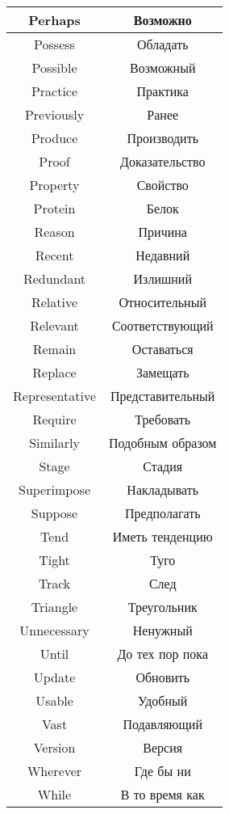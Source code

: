 \begin{table}[h!]
  \centering
  \begin{tabular}{|*{2}{C{.4}|}} \hline
    Perhaps & Возможно \\ \hline
    Possess & Обладать \\ \hline
    Possible & Возможный \\ \hline
    Practice & Практика \\ \hline
    Previously & Ранее \\ \hline
    Produce & Производить \\ \hline
    Proof & Доказательство \\ \hline
    Property & Свойство \\ \hline
    Protein & Белок \\ \hline
    Reason & Причина \\ \hline
    Recent & Недавний \\ \hline
    Redundant & Излишний \\ \hline
    Relative & Относительный \\ \hline
    Relevant & Соответствующий \\ \hline
    Remain & Оставаться \\ \hline
    Replace & Замещать \\ \hline
    Representative & Представительный \\ \hline
    Require & Требовать \\ \hline
    Similarly & Подобным образом \\ \hline
    Stage & Стадия \\ \hline
    Superimpose & Накладывать \\ \hline
    Suppose & Предполагать \\ \hline
    Tend & Иметь тенденцию \\ \hline
    Tight & Туго \\ \hline
    Track & След \\ \hline
    Triangle & Треугольник \\ \hline
    Unnecessary & Ненужный \\ \hline
    Until & До тех пор пока \\ \hline
    Update & Обновить \\ \hline
    Usable & Удобный \\ \hline    
    Vast & Подавляющий \\ \hline
    Version & Версия \\ \hline
    Wherever & Где бы ни \\ \hline
    While & В то время как \\ \hline
  \end{tabular}
\end{table}

